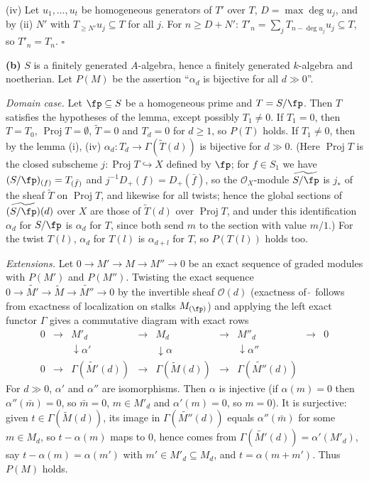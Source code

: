 \documentclass[11pt]{article}
\begin{document}
(iv) Let $u_1,\dots,u_t$ be homogeneous generators of $T'$ over $T$, $D=\max\deg u_j$, and by (ii) $N'$ with $T_{\ge N'}u_j\subseteq T$ for all $j$. For $n\ge D+N'$: $T'_n=\sum_jT_{n-\deg u_j}u_j\subseteq T$, so $T'_n=T_n$. $\square$

\medskip
\textbf{(b)} $S$ is a finitely generated $A$-algebra, hence a finitely generated $k$-algebra and noetherian. Let $P(M)$ be the assertion ``$\alpha_d$ is bijective for all $d\gg0$''.

\emph{Domain case.} Let $\fp\subseteq S$ be a homogeneous prime and $T=S/\fp$. Then $T$ satisfies the hypotheses of the lemma, except possibly $T_1\neq0$. If $T_1=0$, then $T=T_0$, $\operatorname{Proj}T=\emptyset$, $\widetilde T=0$ and $T_d=0$ for $d\ge1$, so $P(T)$ holds. If $T_1\ne0$, then by the lemma (i), (iv) $\alpha_d:T_d\to\Gamma(\widetilde T(d))$ is bijective for $d\gg0$. (Here $\operatorname{Proj}T$ is the closed subscheme $j:\operatorname{Proj}T\hookrightarrow X$ defined by $\fp$; for $f\in S_1$ we have $(S/\fp)_{(f)}=T_{(\bar f)}$ and $j^{-1}D_+(f)=D_+(\bar f)$, so the $\mathcal O_X$-module $\widetilde{S/\fp}$ is $j_*$ of the sheaf $\widetilde T$ on $\operatorname{Proj}T$, and likewise for all twists; hence the global sections of $(\widetilde{S/\fp})(d)$ over $X$ are those of $\widetilde T(d)$ over $\operatorname{Proj}T$, and under this identification $\alpha_d$ for $S/\fp$ is $\alpha_d$ for $T$, since both send $m$ to the section with value $m/1$.) For the twist $T(l)$, $\alpha_d$ for $T(l)$ is $\alpha_{d+l}$ for $T$, so $P(T(l))$ holds too.

\emph{Extensions.} Let $0\to M'\to M\to M''\to0$ be an exact sequence of graded modules with $P(M')$ and $P(M'')$. Twisting the exact sequence $0\to\widetilde{M'}\to\widetilde M\to\widetilde{M''}\to0$ by the invertible sheaf $\mathcal O(d)$ (exactness of $\widetilde{\ }$ follows from exactness of localization on stalks $M_{(\fp)}$) and applying the left exact functor $\Gamma$ gives a commutative diagram with exact rows
\[
\begin{array}{ccccccccc}
0&\to&M'_d&\to&M_d&\to&M''_d&\to&0\\
&&\downarrow\alpha'&&\downarrow\alpha&&\downarrow\alpha''&&\\
0&\to&\Gamma(\widetilde{M'}(d))&\to&\Gamma(\widetilde M(d))&\to&\Gamma(\widetilde{M''}(d))&&
\end{array}
\]
For $d\gg0$, $\alpha'$ and $\alpha''$ are isomorphisms. Then $\alpha$ is injective (if $\alpha(m)=0$ then $\alpha''(\bar m)=0$, so $\bar m=0$, $m\in M'_d$ and $\alpha'(m)=0$, so $m=0$). It is surjective: given $t\in\Gamma(\widetilde M(d))$, its image in $\Gamma(\widetilde{M''}(d))$ equals $\alpha''(\bar m)$ for some $m\in M_d$, so $t-\alpha(m)$ maps to $0$, hence comes from $\Gamma(\widetilde{M'}(d))=\alpha'(M'_d)$, say $t-\alpha(m)=\alpha(m')$ with $m'\in M'_d\subseteq M_d$, and $t=\alpha(m+m')$. Thus $P(M)$ holds.
\end{document}
